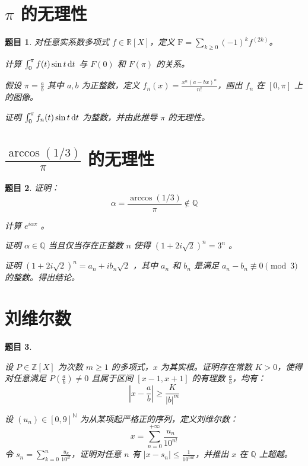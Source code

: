 \documentclass[12pt,UTF8,fontset=none]{ctexbook}
\theoremstyle{exercisestyle}
\newtheorem*{exercise}{题目}
\theoremstyle{solutionstyle}
\begin{document}
\section{$\pi$ 的无理性}
\begin{exercise}
  对任意实系数多项式 $f \in \mathbb{R}[X]$，定义 $\mathrm{F} = \sum\limits_{k \geqslant 0} (-1)^k f^{(2k)}$。
  \begin{subquestions}
    \item 计算 $\int_0^{\pi} f(t) \sin t \,\mathrm{d}t$ 与 $F(0)$ 和 $F(\pi)$ 的关系。
    \item 假设 $\pi = \frac{a}{b}$ 其中 $a, b$ 为正整数，定义 $f_n(x) = \frac{x^n (a - bx)^n}{n!}$，画出 $f_n$ 在 $[0, \pi]$ 上的图像。
    \item 证明 $\int_0^{\pi} f_n(t) \sin t \,\mathrm{d}t$ 为整数，并由此推导 $\pi$ 的无理性。
  \end{subquestions}
\end{exercise}

\section{$\frac{\arccos (1/3)}{\pi}$ 的无理性}
\begin{exercise}
证明：
$$
\alpha = \frac{\arccos (1/3)}{\pi} \notin \mathbb{Q}
$$
\begin{subquestions}
\item 计算 $e^{i\alpha\pi}$ 。
\item 证明 $\alpha \in \mathbb{Q}$ 当且仅当存在正整数 $n$ 使得 $(1 + 2i\sqrt{2})^n = 3^n$ 。
\item 证明 $(1+2i\sqrt{2})^n = a_n + ib_n\sqrt{2}$ ，其中 $a_n$ 和 $b_n$ 是满足 $a_n - b_n \not\equiv 0 \pmod{3}$ 的整数。得出结论。
\end{subquestions}
\end{exercise}

\section{刘维尔数}
\begin{exercise}
\begin{subquestions}
\item 设 $P \in \mathbb{Z}[X]$ 为次数 $m \geq 1$ 的多项式，$x$ 为其实根。证明存在常数 $K > 0$，使得对任意满足 $\displaystyle P(\frac{a}{b}) \neq 0$ 且属于区间 $[x-1,x+1]$ 的有理数 $\displaystyle\frac{a}{b}$，均有：
$$
\left|x-\frac{a}{b}\right| \geqslant \frac{K}{|b|^m}
$$
\item 设 $(u_n) \in [0, 9]^{\mathbb{N}}$ 为从某项起严格正的序列，定义刘维尔数：
$$
x = \sum_{n=0}^{+\infty} \frac{u_n}{10^{n!}}
$$
令 $\displaystyle s_n = \sum_{k=0}^n \frac{u_k}{10^{k!}}$，证明对任意 $n$ 有 $\displaystyle|x - s_n| \leq \frac{1}{10^{nn!}}$，并推出 $x$ 在 $\mathbb{Q}$ 上超越。
\end{subquestions}
\end{exercise}
\end{document}

